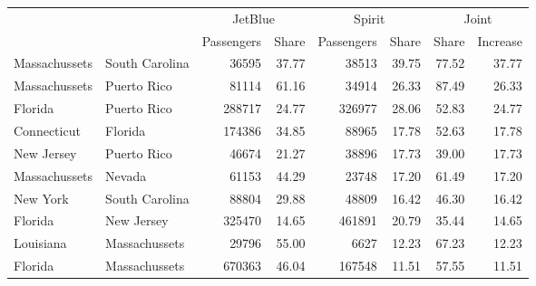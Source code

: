 
\begin{tabular}{llrrrrrr}
\toprule
\multicolumn{1}{c}{ } & \multicolumn{1}{c}{ } & \multicolumn{2}{c}{JetBlue} & \multicolumn{2}{c}{Spirit} & \multicolumn{2}{c}{Joint} \\
\cmidrule(l{3pt}r{3pt}){3-4} \cmidrule(l{3pt}r{3pt}){5-6} \cmidrule(l{3pt}r{3pt}){7-8}
     &      & Passengers & Share & Passengers & Share & Share & Increase\\
\midrule
Massachussets & South Carolina & 36595 & 37.77 & 38513 & 39.75 & 77.52 & 37.77\\
Massachussets & Puerto Rico & 81114 & 61.16 & 34914 & 26.33 & 87.49 & 26.33\\
Florida & Puerto Rico & 288717 & 24.77 & 326977 & 28.06 & 52.83 & 24.77\\
Connecticut & Florida & 174386 & 34.85 & 88965 & 17.78 & 52.63 & 17.78\\
New Jersey & Puerto Rico & 46674 & 21.27 & 38896 & 17.73 & 39.00 & 17.73\\
\addlinespace
Massachussets & Nevada & 61153 & 44.29 & 23748 & 17.20 & 61.49 & 17.20\\
New York & South Carolina & 88804 & 29.88 & 48809 & 16.42 & 46.30 & 16.42\\
Florida & New Jersey & 325470 & 14.65 & 461891 & 20.79 & 35.44 & 14.65\\
Louisiana & Massachussets & 29796 & 55.00 & 6627 & 12.23 & 67.23 & 12.23\\
Florida & Massachussets & 670363 & 46.04 & 167548 & 11.51 & 57.55 & 11.51\\
\bottomrule
\end{tabular}
